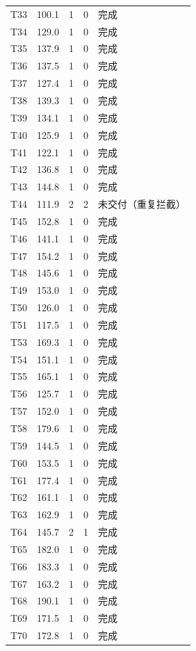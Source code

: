 \documentclass[a4paper,11pt]{article}
\begin{document}
\begin{table}[htbp]
\begin{tabular}{rcccl}
T33 & 100.1 & 1 & 0 & 完成 \\
T34 & 129.0 & 1 & 0 & 完成 \\
T35 & 137.9 & 1 & 0 & 完成 \\
T36 & 137.5 & 1 & 0 & 完成 \\
T37 & 127.4 & 1 & 0 & 完成 \\
T38 & 139.3 & 1 & 0 & 完成 \\
T39 & 134.1 & 1 & 0 & 完成 \\
T40 & 125.9 & 1 & 0 & 完成 \\
T41 & 122.1 & 1 & 0 & 完成 \\
T42 & 136.8 & 1 & 0 & 完成 \\
T43 & 144.8 & 1 & 0 & 完成 \\
T44 & 111.9 & 2 & 2 & 未交付（重复拦截） \\
T45 & 152.8 & 1 & 0 & 完成 \\
T46 & 141.1 & 1 & 0 & 完成 \\
T47 & 154.2 & 1 & 0 & 完成 \\
T48 & 145.6 & 1 & 0 & 完成 \\
T49 & 153.0 & 1 & 0 & 完成 \\
T50 & 126.0 & 1 & 0 & 完成 \\
T51 & 117.5 & 1 & 0 & 完成 \\
T53 & 169.3 & 1 & 0 & 完成 \\
T54 & 151.1 & 1 & 0 & 完成 \\
T55 & 165.1 & 1 & 0 & 完成 \\
T56 & 125.7 & 1 & 0 & 完成 \\
T57 & 152.0 & 1 & 0 & 完成 \\
T58 & 179.6 & 1 & 0 & 完成 \\
T59 & 144.5 & 1 & 0 & 完成 \\
T60 & 153.5 & 1 & 0 & 完成 \\
T61 & 177.4 & 1 & 0 & 完成 \\
T62 & 161.1 & 1 & 0 & 完成 \\
T63 & 162.9 & 1 & 0 & 完成 \\
T64 & 145.7 & 2 & 1 & 完成 \\
T65 & 182.0 & 1 & 0 & 完成 \\
T66 & 183.3 & 1 & 0 & 完成 \\
T67 & 163.2 & 1 & 0 & 完成 \\
T68 & 190.1 & 1 & 0 & 完成 \\
T69 & 171.5 & 1 & 0 & 完成 \\
T70 & 172.8 & 1 & 0 & 完成 \\

\end{tabular}
\end{table}
\end{document}
